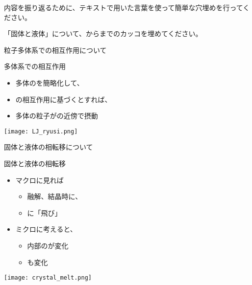 \documentclass[uplatex,dvipdfmx,a4paper,11pt]{jsarticle}
\begin{document}
内容を振り返るために、テキストで用いた言葉を使って簡単な穴埋めを行ってください。
\begin{qlist}
	\qitem 「固体と液体」について、からまでのカッコを埋めてください。
		\begin{qlist2}
			\qitem 粒子多体系での相互作用について
				\begin{center}
					\begin{minipage}{0.52\textwidth}
						\begin{itembox}[l]{多体系での相互作用}
							\begin{itemize}
								\item 多体の\qbox{}を簡略化して、
								\item \qbox{}の相互作用に基づくとすれば、
								\item 多体の粒子が\qbox{}の近傍で摂動
							\end{itemize}
						\end{itembox}
					\end{minipage}
					\begin{minipage}{0.32\textwidth}
						\begin{center}
						\texttt{[image: LJ\_ryusi.png]}
						\end{center}
					\end{minipage}
			\end{center}

		\qitem 固体と液体の相転移について
			\begin{center}
				\begin{minipage}{0.42\textwidth}
					\begin{itembox}[l]{固体と液体の相転移}
						\begin{itemize}
							\item マクロに見れば
							\begin{itemize}
								\item 融解、結晶時に、
								\item \qbox{}に「飛び」
							\end{itemize}
							\item ミクロに考えると、
							\begin{itemize}
								\item 内部の\qbox{}が変化
								\item \qbox{}も変化
							\end{itemize}
						\end{itemize}
					\end{itembox}
				\end{minipage}
				\begin{minipage}{0.42\textwidth}
					\begin{center}
					\texttt{[image: crystal\_melt.png]}
					\end{center}
				\end{minipage}
			\end{center}
			

\end{qlist2}
\end{qlist}
\end{document}
